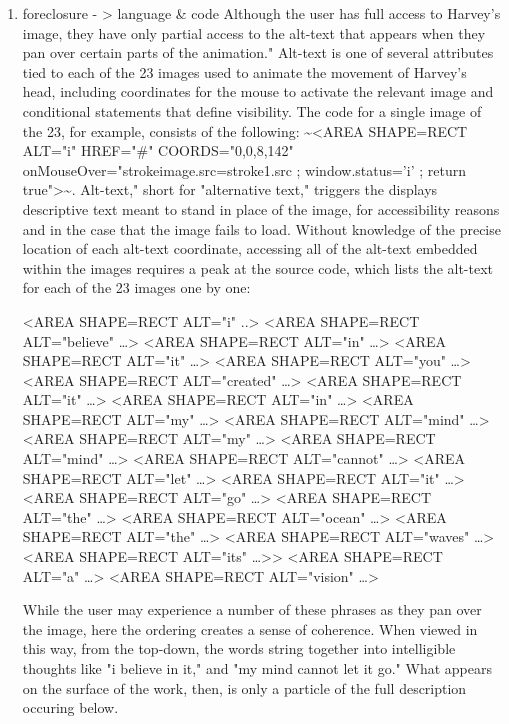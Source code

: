 \documentclass[11pt]{article}
\begin{document}
\begin{enumerate}
\item foreclosure - > language \& code
\label{sec:org5035bdc}
Although the user has full access to Harvey's image, they have only
partial access to the alt-text that appears when they pan over certain
parts of the animation." Alt-text is one of several attributes tied to
each of the 23 images used to animate the movement of Harvey's head,
including coordinates for the mouse to activate the relevant image and
conditional statements that define visibility. The code for a single
image of the 23, for example, consists of the following: \textasciitilde{}<AREA
SHAPE=RECT ALT="i" HREF="\#" COORDS="0,0,8,142"
onMouseOver="strokeimage.src=stroke1.src ; window.status='i' ; return
true">\textasciitilde{}. Alt-text," short for "alternative text," triggers the
displays descriptive text meant to stand in place of the image, for
accessibility reasons and in the case that the image fails to
load. Without knowledge of the precise location of each alt-text
coordinate, accessing all of the alt-text embedded within the images
requires a peak at the source code, which lists the alt-text for each
of the 23 images one by one:
\begin{SOURCE}
<AREA SHAPE=RECT ALT="i" ..>
<AREA SHAPE=RECT ALT="believe" \ldots{}>
<AREA SHAPE=RECT ALT="in" \ldots{}>
<AREA SHAPE=RECT ALT="it" \ldots{}>
<AREA SHAPE=RECT ALT="you" \ldots{}>
<AREA SHAPE=RECT ALT="created" \ldots{}>
<AREA SHAPE=RECT ALT="it" \ldots{}>
<AREA SHAPE=RECT ALT="in" \ldots{}>
<AREA SHAPE=RECT ALT="my" \ldots{}>
<AREA SHAPE=RECT ALT="mind" \ldots{}>
<AREA SHAPE=RECT ALT="my" \ldots{}>
<AREA SHAPE=RECT ALT="mind" \ldots{}>
<AREA SHAPE=RECT ALT="cannot" \ldots{}>
<AREA SHAPE=RECT ALT="let" \ldots{}>
<AREA SHAPE=RECT ALT="it" \ldots{}>
<AREA SHAPE=RECT ALT="go" \ldots{}>
<AREA SHAPE=RECT ALT="the" \ldots{}>
<AREA SHAPE=RECT ALT="ocean" \ldots{}>
<AREA SHAPE=RECT ALT="the" \ldots{}>
<AREA SHAPE=RECT ALT="waves" \ldots{}>
<AREA SHAPE=RECT ALT="its" \ldots{}>>
<AREA SHAPE=RECT ALT="a" \ldots{}>
<AREA SHAPE=RECT ALT="vision" \ldots{}>
\end{SOURCE}
While the user may experience a number of these phrases as they pan
over the image, here the ordering creates a sense of coherence. When
viewed in this way, from the top-down, the words string together into
intelligible thoughts like "i believe in it," and "my mind cannot let
it go." What appears on the surface of the work, then, is only a
particle of the full description occuring below. 


\end{enumerate}
\end{document}
